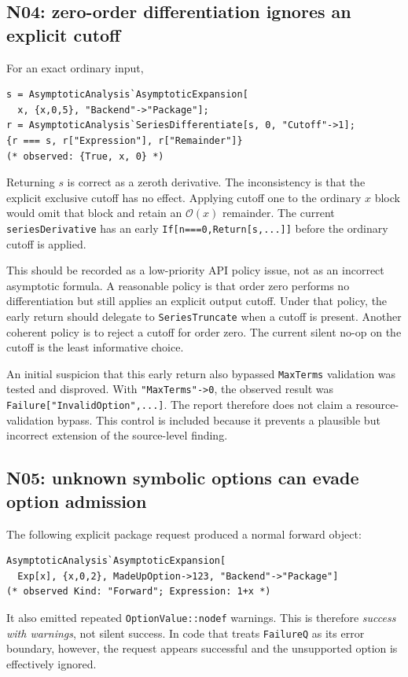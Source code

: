 \documentclass[11pt,letterpaper]{article}
\newcommand{\code}[1]{\nolinkurl{#1}}
\newcommand{\OO}{\mathcal{O}}
\begin{document}
\subsection{N04: zero-order differentiation ignores an explicit cutoff}
For an exact ordinary input,
\begin{lstlisting}
s = AsymptoticAnalysis`AsymptoticExpansion[
  x, {x,0,5}, "Backend"->"Package"];
r = AsymptoticAnalysis`SeriesDifferentiate[s, 0, "Cutoff"->1];
{r === s, r["Expression"], r["Remainder"]}
(* observed: {True, x, 0} *)
\end{lstlisting}
Returning $s$ is correct as a zeroth derivative. The inconsistency is that the
explicit exclusive cutoff has no effect. Applying cutoff one to the ordinary
$x$ block would omit that block and retain an $\OO(x)$ remainder. The current
\code{seriesDerivative} has an early \code{If[n===0,Return[s,...]]} before the
ordinary cutoff is applied.~\cite{operations}

This should be recorded as a low-priority API policy issue, not as an incorrect
asymptotic formula. A reasonable policy is that order zero performs no
differentiation but still applies an explicit output cutoff. Under that policy,
the early return should delegate to \code{SeriesTruncate} when a cutoff is
present. Another coherent policy is to reject a cutoff for order zero. The
current silent no-op on the cutoff is the least informative choice.

An initial suspicion that this early return also bypassed \code{MaxTerms}
validation was tested and disproved. With \code{"MaxTerms"->0}, the observed
result was \code{Failure["InvalidOption",...]}. The report therefore does not
claim a resource-validation bypass. This control is included because it
prevents a plausible but incorrect extension of the source-level finding.

\subsection{N05: unknown symbolic options can evade option admission}
The following explicit package request produced a normal forward object:
\begin{lstlisting}
AsymptoticAnalysis`AsymptoticExpansion[
  Exp[x], {x,0,2}, MadeUpOption->123, "Backend"->"Package"]
(* observed Kind: "Forward"; Expression: 1+x *)
\end{lstlisting}
It also emitted repeated \code{OptionValue::nodef} warnings. This is therefore
\emph{success with warnings}, not silent success. In code that treats
\code{FailureQ} as its error boundary, however, the request appears successful
and the unsupported option is effectively ignored.
\end{document}
